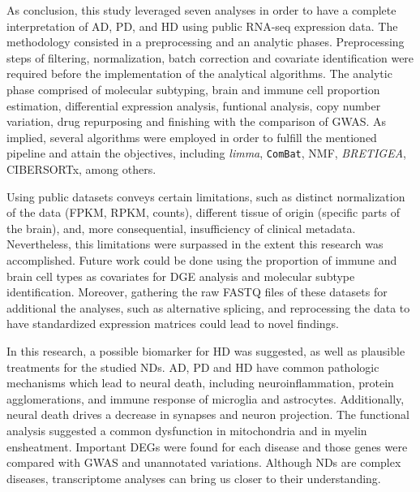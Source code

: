As conclusion, this study leveraged seven analyses in order to have a complete interpretation of AD, PD, and HD using public RNA-seq expression data. The methodology consisted in a preprocessing and an analytic phases. Preprocessing steps of filtering, normalization, batch correction and covariate identification were required before the implementation of the analytical algorithms. The analytic phase comprised of molecular subtyping, brain and immune cell proportion estimation, differential expression analysis, funtional analysis, copy number variation, drug repurposing and finishing with the comparison of GWAS. As implied, several algorithms were employed in order to fulfill the mentioned pipeline and attain the objectives, including \textit{limma}, \verb|ComBat|, NMF, \textit{BRETIGEA}, CIBERSORTx, among others. 

Using public datasets conveys certain limitations, such as distinct normalization of the data (FPKM, RPKM, counts), different tissue of origin (specific parts of the brain), and, more consequential, insufficiency of clinical metadata. Nevertheless, this limitations were surpassed in the extent this research was accomplished. Future work could be done using the proportion of immune and brain cell types as covariates for DGE analysis and molecular subtype identification. Moreover, gathering the raw FASTQ files of these datasets for additional the analyses, such as alternative splicing, and reprocessing the data to have standardized expression matrices could lead to novel findings.

In this research, a possible biomarker for HD was suggested, as well as plausible treatments for the studied NDs. AD, PD and HD have common pathologic mechanisms which lead to neural death, including neuroinflammation, protein agglomerations, and immune response of microglia and astrocytes. Additionally, neural death drives a decrease in synapses and neuron projection. The functional analysis suggested a common dysfunction in mitochondria and in myelin ensheatment. Important DEGs were found for each disease and those genes were compared with GWAS and unannotated variations. Although NDs are complex diseases, transcriptome analyses can bring us closer to their understanding.